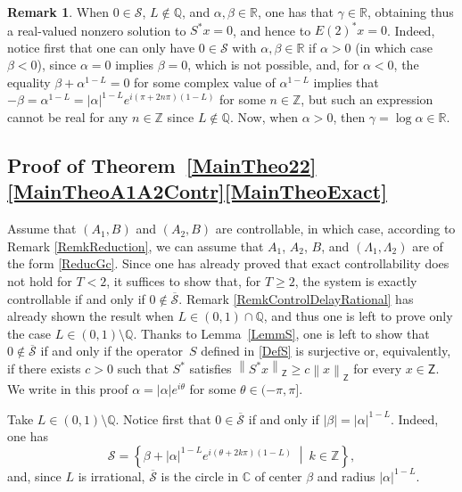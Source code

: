 \documentclass[10pt]{article}
\theoremstyle{plain}
\theoremstyle{definition}
\newtheorem{remk}[theo]{Remark}
\newcommand{\midsuchthat}{\;\middle|\:}
\newcommand{\norm}[1]{\left\lVert #1\right\lVert}
\newcommand{\abs}[1]{\left\lvert #1\right \rvert}
\numberwithin{equation}{section}\numberwithin{figure}{section}\emergencystretch=3em
\begin{document}
\begin{remk}
When $0 \in \mathcal S$, $L \notin \mathbb Q$, and $\alpha, \beta \in \mathbb R$, one has that $\gamma \in \mathbb R$, obtaining thus a real-valued nonzero solution to $S^\ast x = 0$, and hence to $E(2)^\ast x = 0$. Indeed, notice first that one can only have $0 \in \mathcal S$ with $\alpha, \beta \in \mathbb R$ if $\alpha > 0$ (in which case $\beta < 0$), since $\alpha = 0$ implies $\beta = 0$, which is not possible, and, for $\alpha < 0$, the equality $\beta + \alpha^{1 - L} = 0$ for some complex value of $\alpha^{1 - L}$ implies that $-\beta = \alpha^{1-L} = \abs{\alpha}^{1-L} e^{i (\pi + 2 n \pi)(1 - L)}$ for some $n \in \mathbb Z$, but such an expression cannot be real for any $n \in \mathbb Z$ since $L \notin \mathbb Q$. Now, when $\alpha > 0$, then $\gamma = \log\alpha \in \mathbb R$.
\end{remk}

\subsection{Proof of Theorem~\ref{MainTheo22}\eqref{MainTheoA1A2Contr}\eqref{MainTheoExact}}
Assume that $(A_1, B)$ and $(A_2, B)$ are controllable, in which case, according to Remark \ref{RemkReduction}, we can assume that $A_1$, $A_2$, $B$, and $(\Lambda_1, \Lambda_2)$ are of the form \eqref{ReducGc}. Since one has already proved that exact controllability does not hold for $T < 2$, it suffices to show that, for $T \geq 2$, the system is exactly controllable if and only if $0 \notin \overline{\mathcal S}$. Remark \ref{RemkControlDelayRational} has already shown the result when $L \in (0, 1) \cap \mathbb Q$, and thus one is left to prove only the case $L \in (0, 1) \setminus \mathbb Q$. Thanks to Lemma~\ref{LemmS}, one is left to show that $0 \notin \overline{\mathcal S}$ if and only if the operator~$S$ defined in \eqref{DefS} is surjective or, equivalently, if there exists $c > 0$ such that $S^\ast$ satisfies $\norm{S^\ast x}_{\mathsf Z} \geq c \norm{x}_{\mathsf Z}$ for every $x \in \mathsf Z$. We write in this proof $\alpha = \abs{\alpha} e^{i\theta}$ for some $\theta \in (-\pi, \pi]$.

Take $L \in (0, 1) \setminus \mathbb Q$. Notice first that $0 \in \overline{\mathcal S}$ if and only if $\abs{\beta} = \abs{\alpha}^{1-L}$. Indeed, one has
\[
\mathcal S = \left\{\beta + \abs{\alpha}^{1 - L} e^{i (\theta + 2 k \pi)\left(1 - L\right)} \midsuchthat k \in \mathbb Z\right\},
\]
and, since $L$ is irrational, $\overline{\mathcal S}$ is the circle in $\mathbb C$ of center $\beta$ and radius $\abs{\alpha}^{1-L}$.
\end{document}
